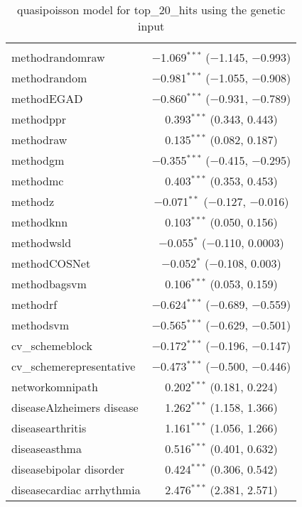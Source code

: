 
\begin{table}[!htbp] \centering 
  \caption{quasipoisson model for top_20_hits using the genetic input} 
  \label{} 
\begin{tabular}{@{\extracolsep{5pt}}lc} 
\\[-1.8ex]\hline 
\hline \\[-1.8ex] 
 methodrandomraw & $-$1.069$^{***}$ ($-$1.145, $-$0.993) \\ 
  methodrandom & $-$0.981$^{***}$ ($-$1.055, $-$0.908) \\ 
  methodEGAD & $-$0.860$^{***}$ ($-$0.931, $-$0.789) \\ 
  methodppr & 0.393$^{***}$ (0.343, 0.443) \\ 
  methodraw & 0.135$^{***}$ (0.082, 0.187) \\ 
  methodgm & $-$0.355$^{***}$ ($-$0.415, $-$0.295) \\ 
  methodmc & 0.403$^{***}$ (0.353, 0.453) \\ 
  methodz & $-$0.071$^{**}$ ($-$0.127, $-$0.016) \\ 
  methodknn & 0.103$^{***}$ (0.050, 0.156) \\ 
  methodwsld & $-$0.055$^{*}$ ($-$0.110, 0.0003) \\ 
  methodCOSNet & $-$0.052$^{*}$ ($-$0.108, 0.003) \\ 
  methodbagsvm & 0.106$^{***}$ (0.053, 0.159) \\ 
  methodrf & $-$0.624$^{***}$ ($-$0.689, $-$0.559) \\ 
  methodsvm & $-$0.565$^{***}$ ($-$0.629, $-$0.501) \\ 
  cv\_schemeblock & $-$0.172$^{***}$ ($-$0.196, $-$0.147) \\ 
  cv\_schemerepresentative & $-$0.473$^{***}$ ($-$0.500, $-$0.446) \\ 
  networkomnipath & 0.202$^{***}$ (0.181, 0.224) \\ 
  diseaseAlzheimers disease & 1.262$^{***}$ (1.158, 1.366) \\ 
  diseasearthritis & 1.161$^{***}$ (1.056, 1.266) \\ 
  diseaseasthma & 0.516$^{***}$ (0.401, 0.632) \\ 
  diseasebipolar disorder & 0.424$^{***}$ (0.306, 0.542) \\ 
  diseasecardiac arrhythmia & 2.476$^{***}$ (2.381, 2.571) \\ 

\end{tabular}
\end{table}
